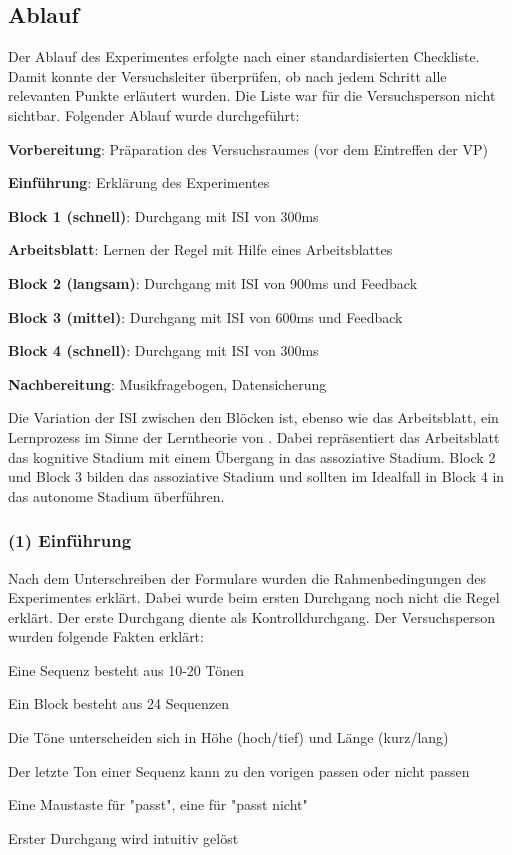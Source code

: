 \documentclass[doc,a4paper,12pt]{apa6}
\begin{document}
\subsection{Ablauf}

Der Ablauf des Experimentes erfolgte nach einer standardisierten Checkliste. Damit konnte der Versuchsleiter überprüfen, ob nach jedem Schritt alle relevanten Punkte erläutert wurden. Die Liste war für die Versuchsperson nicht sichtbar. Folgender Ablauf wurde durchgeführt:

\begin{compactenum}
  \setcounter{enumi}{-1}
  \item \textbf{Vorbereitung}: Präparation des Versuchsraumes (vor dem Eintreffen der VP)
  \item \textbf{Einführung}: Erklärung des Experimentes
  \item \textbf{Block 1 (schnell)}: Durchgang mit ISI von 300ms
  \item \textbf{Arbeitsblatt}: Lernen der Regel mit Hilfe eines Arbeitsblattes
  \item \textbf{Block 2 (langsam)}: Durchgang mit ISI von 900ms und Feedback
  \item \textbf{Block 3 (mittel)}: Durchgang mit ISI von 600ms und Feedback
  \item \textbf{Block 4 (schnell)}: Durchgang mit ISI von 300ms
  \item \textbf{Nachbereitung}: Musikfragebogen, Datensicherung
\end{compactenum}

Die Variation der ISI zwischen den Blöcken ist, ebenso wie das Arbeitsblatt, ein Lernprozess im Sinne der Lerntheorie von \textcite{fitts1967human}. Dabei repräsentiert das Arbeitsblatt das kognitive Stadium mit einem Übergang in das assoziative Stadium. Block 2 und Block 3 bilden das assoziative Stadium und sollten im Idealfall in Block 4 in das autonome Stadium überführen.

\subsubsection{(1) Einführung}

Nach dem Unterschreiben der Formulare wurden die Rahmenbedingungen des Experimentes erklärt. Dabei wurde beim ersten Durchgang noch nicht die Regel erklärt. Der erste Durchgang diente als Kontrolldurchgang. Der Versuchsperson wurden folgende Fakten erklärt:

\begin{compactitem}
\item Eine Sequenz besteht aus 10-20 Tönen
\item Ein Block besteht aus 24 Sequenzen
\item Die Töne unterscheiden sich in Höhe (hoch/tief) und Länge (kurz/lang)
\item Der letzte Ton einer Sequenz kann zu den vorigen passen oder nicht passen
\item Eine Maustaste für "passt", eine für "passt nicht"
\item Erster Durchgang wird intuitiv gelöst
\end{compactitem}
\end{document}
